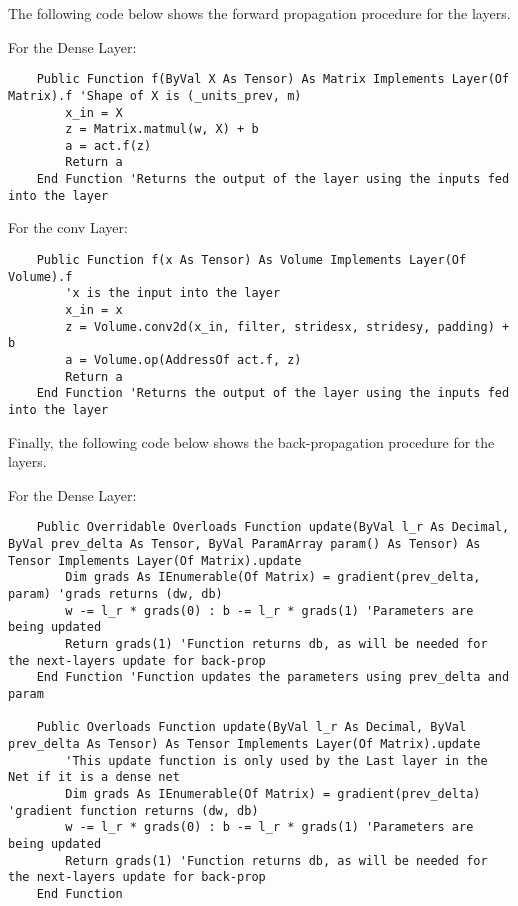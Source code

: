 The following code below shows the forward propagation procedure for the layers.

For the Dense Layer: 
\begin{verbatim}
    Public Function f(ByVal X As Tensor) As Matrix Implements Layer(Of Matrix).f 'Shape of X is (_units_prev, m)
        x_in = X
        z = Matrix.matmul(w, X) + b
        a = act.f(z)
        Return a
    End Function 'Returns the output of the layer using the inputs fed into the layer
\end{verbatim}

For the conv Layer:
\begin{verbatim}
    Public Function f(x As Tensor) As Volume Implements Layer(Of Volume).f
        'x is the input into the layer
        x_in = x
        z = Volume.conv2d(x_in, filter, stridesx, stridesy, padding) + b
        a = Volume.op(AddressOf act.f, z)
        Return a
    End Function 'Returns the output of the layer using the inputs fed into the layer
\end{verbatim}

Finally, the following code below shows the back-propagation procedure for the layers.

For the Dense Layer: 
\begin{verbatim}
    Public Overridable Overloads Function update(ByVal l_r As Decimal, ByVal prev_delta As Tensor, ByVal ParamArray param() As Tensor) As Tensor Implements Layer(Of Matrix).update
        Dim grads As IEnumerable(Of Matrix) = gradient(prev_delta, param) 'grads returns (dw, db)
        w -= l_r * grads(0) : b -= l_r * grads(1) 'Parameters are being updated
        Return grads(1) 'Function returns db, as will be needed for the next-layers update for back-prop
    End Function 'Function updates the parameters using prev_delta and  param

    Public Overloads Function update(ByVal l_r As Decimal, ByVal prev_delta As Tensor) As Tensor Implements Layer(Of Matrix).update
        'This update function is only used by the Last layer in the Net if it is a dense net
        Dim grads As IEnumerable(Of Matrix) = gradient(prev_delta) 'gradient function returns (dw, db)
        w -= l_r * grads(0) : b -= l_r * grads(1) 'Parameters are being updated
        Return grads(1) 'Function returns db, as will be needed for the next-layers update for back-prop
    End Function
\end{verbatim}

